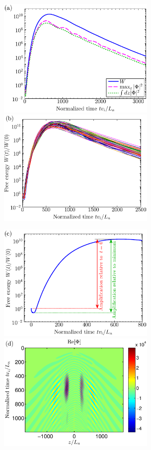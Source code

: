 \documentclass{jpp}
\begin{document}
\begin{figure}
\centerline{
\includegraphics[width=3in]{fig1a.eps}
\includegraphics[width=3in]{fig1b.eps}
}
\centerline{
\includegraphics[width=3in]{fig1c.eps}
\includegraphics[width=3in]{fig1d.eps}
}
\end{figure}
\end{document}
